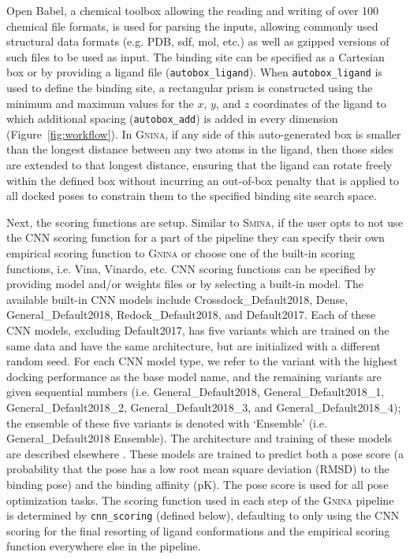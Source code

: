 \documentclass[journal=jcisd8,manuscript=article]{achemso}
\begin{document}
Open Babel\cite{o2011open,babelopen}, a chemical toolbox allowing the reading and writing of over 100 chemical file formats, is used for parsing the inputs, allowing commonly used structural data formats (e.g. PDB, sdf, mol, etc.) as well as gzipped versions of such files to be used as input. The binding site can be specified as a Cartesian box or by providing a ligand file (\texttt{autobox\_ligand}).  When \texttt{autobox\_ligand} is used to define the binding site, a rectangular prism is constructed using the minimum and maximum values for the $x$, $y$, and $z$ coordinates of the ligand to which additional spacing (\texttt{autobox\_add}) is added in every dimension (Figure~\ref{fig:workflow}). In \textsc{Gnina}, if any side of this auto-generated box is smaller than the longest distance between any two atoms in the ligand, then those sides are extended to that longest distance, ensuring that the ligand can rotate freely within the defined box without incurring an out-of-box penalty that is applied to all docked poses to constrain them to the specified binding site search space.

Next, the scoring functions are setup. Similar to \textsc{Smina}, if the user opts to not use the CNN scoring function for a part of the pipeline they can specify their own empirical scoring function to \textsc{Gnina} or choose one of the built-in scoring functions, i.e. Vina, Vinardo\cite{quiroga2016vinardo}, etc. CNN scoring functions can be specified by providing model and/or weights files or by selecting a built-in model.  The available built-in CNN models include Crossdock\_Default2018, Dense, General\_Default2018, Redock\_Default2018, and Default2017. Each of these CNN models, excluding Default2017, has five variants which are trained on the same data and have the same architecture, but are initialized with a different random seed. For each CNN model type, we refer to the variant with the highest docking performance as the base model name, and the remaining variants are given sequential numbers (i.e. General\_Default2018, General\_Default2018\_1, General\_Default2018\_2, General\_Default2018\_3, and General\_Default2018\_4); the ensemble of these five variants is denoted with `Ensemble' (i.e. General\_Default2018 Ensemble). The architecture and training of these models are described elsewhere \cite{francoeur2020three,Ragoza2017}. These models are trained to predict both a pose score (a probability that the pose has a low root mean square deviation (RMSD) to the binding pose) and the binding affinity (pK). The pose score is used for all pose optimization tasks. The scoring function used in each step of the \textsc{Gnina} pipeline is determined by \texttt{cnn\_scoring} (defined below), defaulting to only using the CNN scoring for the final resorting of ligand conformations and the empirical scoring function everywhere else in the pipeline. 
\end{document}

